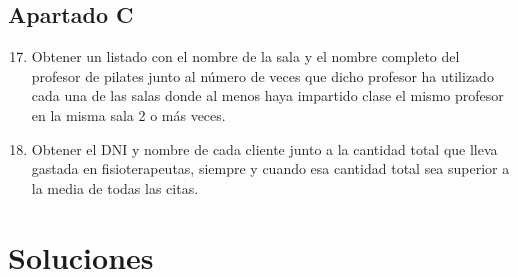\subsection{Apartado C}

\begin{enumerate}
    \setcounter{enumi}{16}
    \item Obtener un listado con el nombre de la sala y el nombre completo del profesor de pilates junto al número de veces que dicho profesor ha utilizado cada una de las salas donde al menos haya impartido clase el mismo profesor en la misma sala 2 o más veces.
    \item Obtener el DNI y nombre de cada cliente junto a la cantidad total que lleva gastada en fisioterapeutas, siempre y cuando esa cantidad total sea superior a la media de todas las citas.
\end{enumerate}

\section{Soluciones}

%
%


